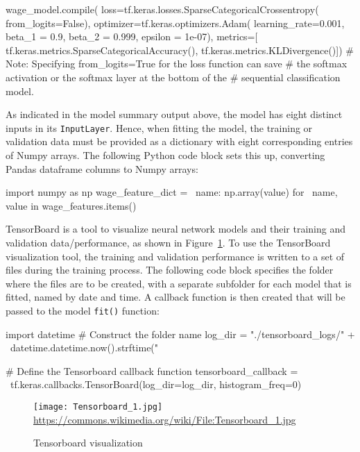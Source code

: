\begin{pythoncode}
wage_model.compile(
    loss=tf.keras.losses.SparseCategoricalCrossentropy(
       from_logits=False),
    optimizer=tf.keras.optimizers.Adam(
        learning_rate=0.001,
        beta_1 = 0.9,
        beta_2 = 0.999,
        epsilon = 1e-07),
    metrics=[
        tf.keras.metrics.SparseCategoricalAccuracy(), 
        tf.keras.metrics.KLDivergence()])
# Note: Specifying from_logits=True for the loss function can save 
# the softmax activation or the softmax layer at the bottom of the 
# sequential classification model.
\end{pythoncode}

As indicated in the model summary output above, the model has eight distinct inputs in its \texttt{InputLayer}. Hence, when fitting the model, the training or validation data must be provided as a dictionary with eight corresponding entries of Numpy arrays. The following Python code block sets this up, converting Pandas dataframe columns to Numpy arrays:

\begin{pythoncode}
import numpy as np
wage_feature_dict = \
    {name: np.array(value) for \
        name, value in wage_features.items()}
\end{pythoncode}

TensorBoard is a tool to visualize neural network models and their training and validation data/performance, as shown in Figure~\ref{fig:tensorboard}. To use the TensorBoard visualization tool, the training and validation performance is written to a set of files during the training process. The following code block specifies the folder where the files are to be created, with a separate subfolder for each model that is fitted, named by date and time. A callback function is then created that will be passed to the model \texttt{fit()} function:

\begin{pythoncode}
import datetime
# Construct the folder name
log_dir = "./tensorboard_logs/" + \
    datetime.datetime.now().strftime("%
    
# Define the Tensorboard callback function
tensorboard_callback = \
    tf.keras.callbacks.TensorBoard(log_dir=log_dir, histogram_freq=0)
\end{pythoncode}

\begin{figure}
\centering
\texttt{[image: Tensorboard\_1.jpg]} \\

\scriptsize \url{https://commons.wikimedia.org/wiki/File:Tensorboard_1.jpg}
\caption{Tensorboard visualization}
\label{fig:tensorboard}
\end{figure}

